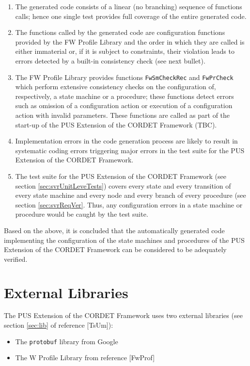\documentclass{pnp_article}
\begin{document}
\begin{enumerate}
\item The generated code consists of a linear (no branching) sequence of functions calls; hence one single test provides full coverage of the entire generated code.
\item The functions called by the generated code are configuration functions provided by the FW Profile Library and the order in which they are called is either immaterial or, if it is subject to constraints, their violation leads to errors detected by a built-in consistency check (see next bullet).
\item The FW Profile Library provides functions \texttt{FwSmCheckRec} and \texttt{FwPrCheck} which perform extensive consistency checks on the configuration of, respectively, a state machine or a procedure; these functions detect errors such as omission of a configuration action or execution of a configuration action with invalid parameters. These functions are called as part of the start-up of the PUS Extension of the CORDET Framework (TBC).
\item Implementation errors in the code generation process are likely to result in systematic coding errors triggering major errors in the test suite for the PUS Extension of the CORDET Framework.
\item The test suite for the PUS Extension of the CORDET Framework (see section \ref{sec:svrUnitLeveTests}) covers every state and every transition of every state machine and every node and every branch of every procedure (see section \ref{sec:svrReqVer}. Thus, any configuration errors in a state machine or procedure would be caught by the test suite.
\end{enumerate}

Based on the above, it is concluded that the automatically generated code implementing the configuration of the state machines and procedures of the PUS Extension of the CORDET Framework can be considered to be adequately verified.



\section{External Libraries}\label{sec:svrExtLib}
The PUS Extension of the CORDET Framework uses two external libraries (see section \ref{sec:lib} of reference [TsUm]):

\begin{itemize}
\item The \texttt{protobuf} library from Google
\item The W Profile Library from reference [FwProf]
\end{itemize}
\end{document}
